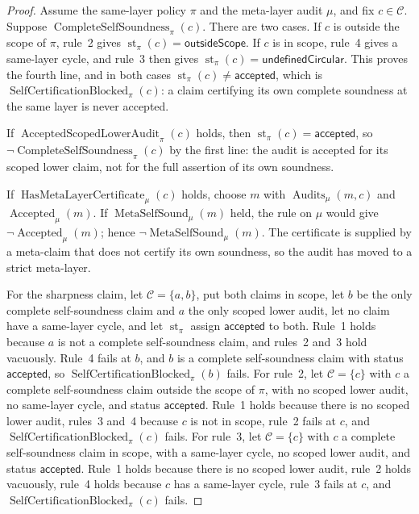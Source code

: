 \begin{proof}
Assume the same-layer policy \(\pi\) and the meta-layer audit
\(\mu\), and fix \(c\in\mathcal C\).  Suppose
\(\operatorname{CompleteSelfSoundness}_{\pi}(c)\).  There are two
cases.  If \(c\) is outside the scope of \(\pi\), rule~2 gives
\(\operatorname{st}_{\pi}(c)=\mathsf{outsideScope}\).  If \(c\) is in
scope, rule~4 gives a same-layer cycle, and rule~3 then gives
\(\operatorname{st}_{\pi}(c)=\mathsf{undefinedCircular}\).  This proves
the fourth line, and in both cases
\(\operatorname{st}_{\pi}(c)\ne\mathsf{accepted}\), which is
\(\operatorname{SelfCertificationBlocked}_{\pi}(c)\): a claim certifying
its own complete soundness at the same layer is never accepted.

If \(\operatorname{AcceptedScopedLowerAudit}_{\pi}(c)\) holds, then
\(\operatorname{st}_{\pi}(c)=\mathsf{accepted}\), so
\(\neg\operatorname{CompleteSelfSoundness}_{\pi}(c)\) by the first line: the audit is
accepted for its scoped lower claim, not for the full assertion of its
own soundness.

If \(\operatorname{HasMetaLayerCertificate}_{\mu}(c)\) holds, choose
\(m\) with \(\operatorname{Audits}_{\mu}(m,c)\) and
\(\operatorname{Accepted}_{\mu}(m)\).  If
\(\operatorname{MetaSelfSound}_{\mu}(m)\) held, the rule on \(\mu\)
would give \(\neg\operatorname{Accepted}_{\mu}(m)\); hence
\(\neg\operatorname{MetaSelfSound}_{\mu}(m)\).  The certificate is
supplied by a meta-claim that does not certify its own soundness, so
the audit has moved to a strict meta-layer.

For the sharpness claim, let \(\mathcal C=\{a,b\}\), put both claims in scope,
let \(b\) be the only complete self-soundness claim and \(a\) the only scoped
lower audit, let no claim have a same-layer cycle, and let
\(\operatorname{st}_{\pi}\) assign \(\mathsf{accepted}\) to both. Rule~1 holds
because \(a\) is not a complete self-soundness claim, and rules~2 and~3 hold
vacuously. Rule~4 fails at \(b\), and \(b\) is a complete self-soundness claim
with status \(\mathsf{accepted}\), so
\(\operatorname{SelfCertificationBlocked}_{\pi}(b)\) fails. For rule~2, let
\(\mathcal C=\{c\}\) with \(c\) a complete self-soundness claim outside the
scope of \(\pi\), with no scoped lower audit, no same-layer cycle, and status \(\mathsf{accepted}\).
Rule~1 holds because there is no scoped lower audit, rules~3 and~4 because
\(c\) is not in scope, rule~2 fails at \(c\), and
\(\operatorname{SelfCertificationBlocked}_{\pi}(c)\) fails. For rule~3, let
\(\mathcal C=\{c\}\) with \(c\) a complete self-soundness claim in scope, with a
same-layer cycle, no scoped lower audit, and status \(\mathsf{accepted}\).
Rule~1 holds because there is no scoped lower audit, rule~2 holds vacuously,
rule~4 holds because \(c\) has a same-layer cycle, rule~3 fails at \(c\), and
\(\operatorname{SelfCertificationBlocked}_{\pi}(c)\) fails.
\end{proof}

